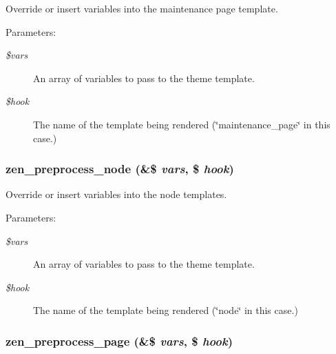 Override or insert variables into the maintenance page template.

\begin{Desc}
\item[Parameters:]
\begin{description}
\item[{\em \$vars}]An array of variables to pass to the theme template. \item[{\em \$hook}]The name of the template being rendered (\char`\"{}maintenance\_\-page\char`\"{} in this case.) \end{description}
\end{Desc}
\hypertarget{sites_2all_2themes_2zen_2template_8php_e04e9c17a2287b871b2d29ec76cd4214}{
\subsubsection[{zen\_\-preprocess\_\-node}]{\setlength{\rightskip}{0pt plus 5cm}zen\_\-preprocess\_\-node (\&\$ {\em vars}, \/  \$ {\em hook})}}
\label{sites_2all_2themes_2zen_2template_8php_e04e9c17a2287b871b2d29ec76cd4214}


Override or insert variables into the node templates.

\begin{Desc}
\item[Parameters:]
\begin{description}
\item[{\em \$vars}]An array of variables to pass to the theme template. \item[{\em \$hook}]The name of the template being rendered (\char`\"{}node\char`\"{} in this case.) \end{description}
\end{Desc}
\hypertarget{sites_2all_2themes_2zen_2template_8php_cf0810eb7d08edfccf3a1d5272348220}{
\subsubsection[{zen\_\-preprocess\_\-page}]{\setlength{\rightskip}{0pt plus 5cm}zen\_\-preprocess\_\-page (\&\$ {\em vars}, \/  \$ {\em hook})}}
\label{sites_2all_2themes_2zen_2template_8php_cf0810eb7d08edfccf3a1d5272348220}


